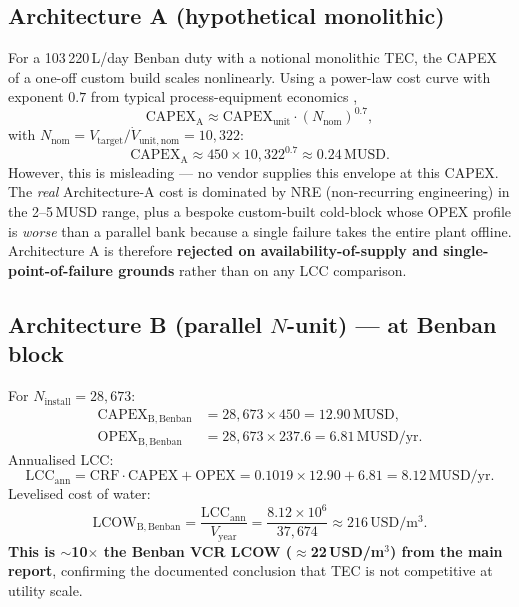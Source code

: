 \documentclass[11pt,a4paper]{article}
\newcommand{\SI}[2]{#1\,\ensuremath{\mathrm{#2}}}
\newcommand{\SIrange}[3]{#1--#2\,\ensuremath{\mathrm{#3}}}
\providecommand{\year}{yr}
\begin{document}
\subsection{Architecture A (hypothetical monolithic)}
For a 103\,220\,L/day Benban duty with a notional monolithic TEC, the CAPEX of a one-off custom build scales nonlinearly. Using a power-law cost curve with exponent $0.7$ from typical process-equipment economics \citep{peters2003plant},
\begin{equation}
\mathrm{CAPEX}_{\mathrm{A}} \approx \mathrm{CAPEX}_{\mathrm{unit}}\cdot (N_{\mathrm{nom}})^{0.7},
\end{equation}
with $N_{\mathrm{nom}}{=}V_{\mathrm{target}}/\dot{V}_{\mathrm{unit,nom}}{=}10{,}322$:
\begin{equation}
\mathrm{CAPEX}_{\mathrm{A}} \approx 450\times 10{,}322^{0.7} \approx \SI{0.24}{MUSD}.
\end{equation}
However, this is misleading --- no vendor supplies this envelope at this CAPEX. The \emph{real} Architecture-A cost is dominated by NRE (non-recurring engineering) in the \SIrange{2}{5}{MUSD} range, plus a bespoke custom-built cold-block whose OPEX profile is \emph{worse} than a parallel bank because a single failure takes the entire plant offline. Architecture A is therefore \textbf{rejected on availability-of-supply and single-point-of-failure grounds} rather than on any LCC comparison.

\subsection{Architecture B (parallel $N$-unit) --- at Benban block}
For $N_{\mathrm{install}}{=}28{,}673$:
\begin{align}
\mathrm{CAPEX}_{\mathrm{B,Benban}} &= 28{,}673 \times 450 = \SI{12.90}{MUSD},\\
\mathrm{OPEX}_{\mathrm{B,Benban}} &= 28{,}673 \times 237.6 = \SI{6.81}{MUSD/\year}.
\end{align}
Annualised LCC:
\begin{equation}
\mathrm{LCC}_{\mathrm{ann}} = \mathrm{CRF}\cdot\mathrm{CAPEX} + \mathrm{OPEX}
= 0.1019\times 12.90 + 6.81 = \SI{8.12}{MUSD/\year}.
\end{equation}
Levelised cost of water:
\begin{equation}
\mathrm{LCOW}_{\mathrm{B,Benban}} = \frac{\mathrm{LCC}_{\mathrm{ann}}}{V_{\mathrm{year}}}
= \frac{8.12\times 10^6}{37{,}674}
\approx 216\,\mathrm{USD/m^3}.
\end{equation}
\textbf{This is $\sim$10$\times$ the Benban VCR LCOW ($\approx$22\,USD/m$^3$) from the main report}, confirming the documented conclusion that TEC is not competitive at utility scale.
\end{document}
